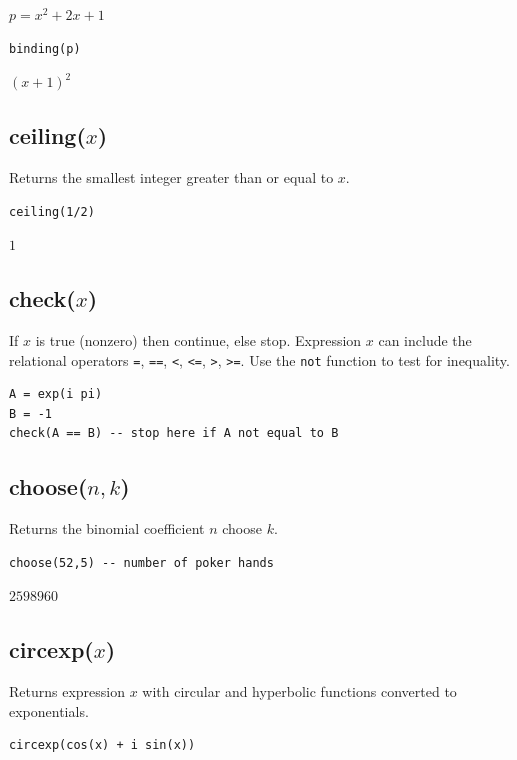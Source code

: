 \documentclass[12pt]{article}
\begin{document}
\noindent
$p=x^2+2x+1$

{\color{blue}
\begin{verbatim}
binding(p)
\end{verbatim}
}

\noindent
$(x+1)^2$

\subsection*{ceiling($x$)}

Returns the smallest integer greater than or equal to $x$.

{\color{blue}
\begin{verbatim}
ceiling(1/2)
\end{verbatim}
}

\noindent
$1$

\subsection*{check($x$)}

If $x$ is true (nonzero) then continue, else stop.
Expression $x$ can include the relational operators
\verb$=$,
\verb$==$,
\verb$<$,
\verb$<=$,
\verb$>$,
\verb$>=$.
Use the
\verb$not$
function to test for inequality.

{\color{blue}
\begin{verbatim}
A = exp(i pi)
B = -1
check(A == B) -- stop here if A not equal to B
\end{verbatim}
}

\subsection*{choose($n,k$)}

Returns the binomial coefficient $n$ choose $k$.

{\color{blue}
\begin{verbatim}
choose(52,5) -- number of poker hands
\end{verbatim}
}

\noindent
$2598960$

\subsection*{circexp($x$)}

Returns expression $x$ with circular and hyperbolic functions
converted to exponentials.

{\color{blue}
\begin{verbatim}
circexp(cos(x) + i sin(x))
\end{verbatim}
}
\end{document}
